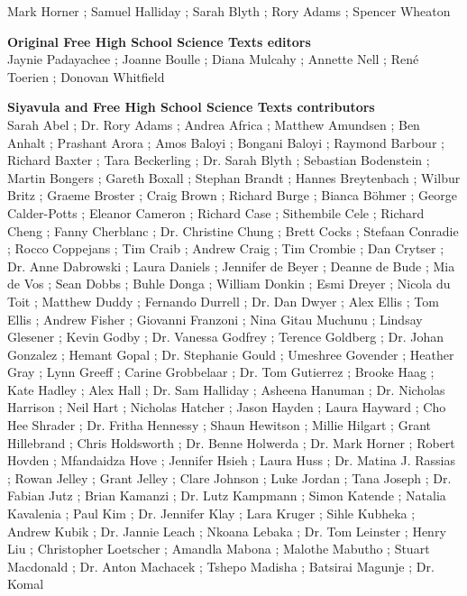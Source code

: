 Mark Horner ; Samuel Halliday ; Sarah Blyth ; Rory Adams ; Spencer Wheaton \par 


\textbf{\LARGE Original Free High School Science Texts editors}\\

Jaynie Padayachee ; Joanne Boulle ; Diana Mulcahy ; Annette Nell ; René Toerien ; Donovan Whitfield \par

\textbf{\LARGE Siyavula and Free High School Science Texts contributors}\\

Sarah Abel ; Dr. Rory Adams ; Andrea Africa ; Matthew Amundsen ; Ben Anhalt ; Prashant Arora ; Amos Baloyi ; Bongani
Baloyi ; Raymond Barbour ; Richard Baxter ; Tara Beckerling ; Dr. Sarah Blyth ; Sebastian Bodenstein ; Martin Bongers ;
Gareth Boxall ; Stephan Brandt ; Hannes Breytenbach ; Wilbur Britz ; Graeme Broster ; Craig Brown ; Richard Burge ;
Bianca Böhmer ; George Calder-Potts ; Eleanor Cameron ; Richard Case ; Sithembile Cele ; Richard Cheng ; Fanny
Cherblanc ; Dr. Christine Chung ; Brett Cocks ; Stefaan Conradie ; Rocco Coppejans ; Tim Craib ; Andrew Craig ; Tim
Crombie ; Dan Crytser ; Dr. Anne Dabrowski ; Laura Daniels ; Jennifer de Beyer ; Deanne de Bude ; Mia de Vos ; Sean
Dobbs ; Buhle Donga ; William Donkin ; Esmi Dreyer ; Nicola du Toit ; Matthew Duddy ; Fernando Durrell ; Dr. Dan
Dwyer ; Alex Ellis ; Tom Ellis ; Andrew Fisher ; Giovanni Franzoni ; Nina Gitau Muchunu ; Lindsay Glesener ; Kevin
Godby ; Dr. Vanessa Godfrey ; Terence Goldberg ; Dr. Johan Gonzalez ; Hemant Gopal ; Dr. Stephanie Gould ; Umeshree
Govender ; Heather Gray ; Lynn Greeff ; Carine Grobbelaar ; Dr. Tom Gutierrez ; Brooke Haag ; Kate Hadley ; Alex Hall ;
Dr. Sam Halliday ; Asheena Hanuman ; Dr. Nicholas Harrison ; Neil Hart ; Nicholas Hatcher ; Jason Hayden ; Laura
Hayward ; Cho Hee Shrader ; Dr. Fritha Hennessy ; Shaun Hewitson ; Millie Hilgart ; Grant Hillebrand ; Chris Holdsworth ;
Dr. Benne Holwerda ; Dr. Mark Horner ; Robert Hovden ; Mfandaidza Hove ; Jennifer Hsieh ; Laura Huss ; Dr. Matina J.
Rassias ; Rowan Jelley ; Grant Jelley ; Clare Johnson ; Luke Jordan ; Tana Joseph ; Dr. Fabian Jutz ; Brian Kamanzi ; Dr.
Lutz Kampmann ; Simon Katende ; Natalia Kavalenia ; Paul Kim ; Dr. Jennifer Klay ; Lara Kruger ; Sihle Kubheka ;
Andrew Kubik ; Dr. Jannie Leach ; Nkoana Lebaka ; Dr. Tom Leinster ; Henry Liu ; Christopher Loetscher ; Amandla
Mabona ; Malothe Mabutho ; Stuart Macdonald ; Dr. Anton Machacek ; Tshepo Madisha ; Batsirai Magunje ; Dr. Komal
